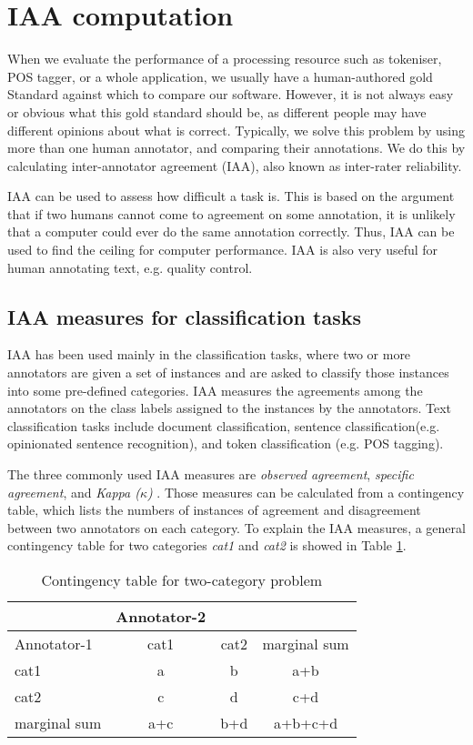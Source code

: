 
\section{IAA computation}
When we evaluate the performance of a processing resource such as tokeniser, 
POS tagger, or a whole application, we usually have a human-authored gold 
Standard against which to compare our software. However, it is not always 
easy or obvious what this gold standard should be, as different people may 
have different opinions about what is correct. Typically, we solve this 
problem by using more than one human annotator, and comparing their annotations. 
We do this by calculating inter-annotator agreement (IAA), also known as 
inter-rater reliability. 

IAA can be used to assess how difficult a task is. This is based on the argument 
that if two humans cannot come to agreement on some annotation, it is unlikely 
that a computer could ever do the same annotation correctly. Thus, IAA can 
be used to find the ceiling for computer performance. IAA is also very useful 
for human annotating text, e.g. quality control.

\subsection{IAA measures for classification tasks}

IAA has been used mainly in the classification tasks, where two or more annotators 
are given a set of instances and are asked to classify those instances into some 
pre-defined categories. IAA measures the agreements among the annotators on the
class labels assigned to the instances by the annotators. Text classification 
tasks include document classification, sentence classification(e.g. opinionated 
sentence recognition), and token classification (e.g. POS tagging).

The three commonly used IAA measures are {\em observed agreement}, {\em specific agreement}, 
and {\em Kappa ($\kappa$)} \cite{Hripcsak02}. Those measures can be 
calculated from a contingency table, which lists the numbers of instances of 
agreement and disagreement between two annotators on each category. To explain the 
IAA measures, a general contingency table for two categories {\em cat1} and {\em cat2}
 is showed in Table \ref{table-contingency}.

\begin{table}[hbt]
\caption{Contingency table for two-category problem
 \label{table-contingency}} \vspace{0.4cm} 
{\centering
\begin{tabular}{l|cc|c} 
\hline
   & Annotator-2 & & \\
\hline
Annotator-1  & cat1 & cat2 & marginal sum\\
\hline
 cat1& a & b & a+b\\ 
cat2 & c & d & c+d\\
\hline
marginal sum & a+c & b+d &a+b+c+d\\
 \hline
\end{tabular}\par}
\end{table}


